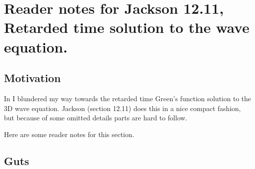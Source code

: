 

\chapter{Reader notes for Jackson 12.11, Retarded time solution to the wave equation.}
\label{chap:jacksonRetarded}
{}
\date{Sept 19, 2009}

\beginArtNoToc

\section{Motivation}

In  I blundered my way towards the retarded time Green's function solution to the 3D wave equation.  Jackson \cite{jackson1975cew} (section 12.11) does this in a nice compact fashion, but because of some omitted details parts are hard to follow.

Here are some reader notes for this section.

\section{Guts}



\EndArticle
